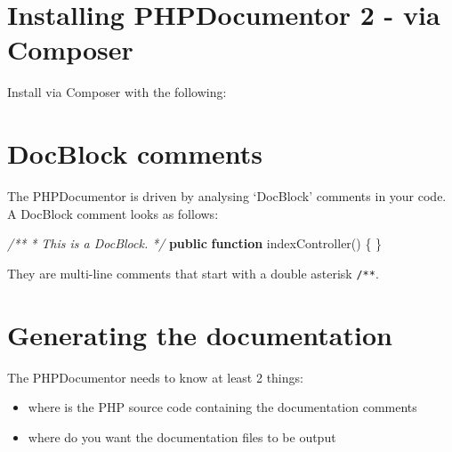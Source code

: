 \documentclass[a4paperpaper,openright]{book}
\newenvironment{Shaded}{}{}
\newcommand{\CommentTok}[1]{\textcolor[rgb]{0.38,0.63,0.69}{\textit{#1}}}
\newcommand{\ExtensionTok}[1]{#1}
\newcommand{\KeywordTok}[1]{\textcolor[rgb]{0.00,0.44,0.13}{\textbf{#1}}}
\newcommand{\NormalTok}[1]{#1}
\newcommand{\OtherTok}[1]{\textcolor[rgb]{0.00,0.44,0.13}{#1}}
\begin{document}
\hypertarget{installing-phpdocumentor-2---via-composer}{%
\section{Installing PHPDocumentor 2 - via
Composer}\label{installing-phpdocumentor-2---via-composer}}

Install via Composer with the following:

\begin{Shaded}
\end{Shaded}

\hypertarget{docblock-comments}{%
\section{DocBlock comments}\label{docblock-comments}}

The PHPDocumentor is driven by analysing `DocBlock' comments in your
code. A DocBlock comment looks as follows:

\begin{Shaded}
\begin{Highlighting}[]
    \CommentTok{/**}
\CommentTok{     * This is a DocBlock.}
\CommentTok{     */}
    \KeywordTok{public} \KeywordTok{function}\NormalTok{ indexController}\OtherTok{()}
\NormalTok{    \{}
\NormalTok{    \}}
\end{Highlighting}
\end{Shaded}

They are multi-line comments that start with a double asterisk
\texttt{/**}.

\hypertarget{generating-the-documentation}{%
\section{Generating the
documentation}\label{generating-the-documentation}}

The PHPDocumentor needs to know at least 2 things:

\begin{itemize}
\item
  where is the PHP source code containing the documentation comments
\item
  where do you want the documentation files to be output
\end{itemize}
\end{document}
